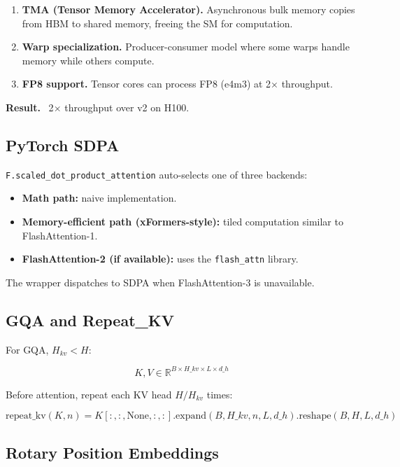 \begin{enumerate}
\item \textbf{TMA (Tensor Memory Accelerator).} Asynchronous bulk memory copies
  from HBM to shared memory, freeing the SM for computation.
\item \textbf{Warp specialization.} Producer-consumer model where some warps handle
  memory while others compute.
\item \textbf{FP8 support.} Tensor cores can process FP8 (e4m3) at 2$\times$ throughput.

\end{enumerate}
\textbf{Result.} ~2$\times$ throughput over v2 on H100.

\subsection{PyTorch SDPA}

\texttt{F.scaled\_dot\_product\_attention} auto-selects one of three backends:

\begin{itemize}
\item \textbf{Math path:} naive implementation.
\item \textbf{Memory-efficient path (xFormers-style):} tiled computation similar
  to FlashAttention-1.
\item \textbf{FlashAttention-2 (if available):} uses the \texttt{flash\_attn} library.

\end{itemize}
The wrapper dispatches to SDPA when FlashAttention-3 is unavailable.

\subsection{GQA and Repeat\_KV}

For GQA, $H_{kv} < H$:

\[
K, V \in \mathbb{R}^{B \times H\_{kv} \times L \times d\_h}
\tag{3.6}
\]

Before attention, repeat each KV head $H/H_{kv}$ times:

\[
\text{repeat\_kv}(K, n) = K[:, :, \text{None}, :, :].\text{expand}(B, H\_{kv}, n, L, d\_h).\text{reshape}(B, H, L, d\_h)
\tag{3.7}
\]

\subsection{Rotary Position Embeddings}

